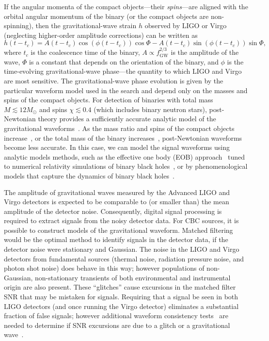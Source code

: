 If the angular momenta of the compact objects---their \emph{spins}---are
aligned with the orbital angular momentum of the binary (or the compact
objects are non-spinning), then the gravitational-wave strain $h$ observed by
LIGO or Virgo  (neglecting higher-order amplitude corrections) can be written as
\begin{equation}
h(t-t_c) = A(t - t_c) \cos( \phi(t - t_c) ) \cos \Phi - A(t - t_c) \sin( \phi(t - t_c) ) \sin \Phi,
\end{equation}
where $t_{c}$ is the coalescence time of the binary, $A \propto f_\mathrm{GW}^{2/3}$ is
the amplitude of the wave, $\Phi$ is a constant that depends on the
orientation of the binary, and $\phi$ is the time-evolving gravitational-wave
phase---the quantity to which LIGO and Virgo are most sensitive. The
gravitational-wave phase evolution is given by the particular waveform model
used in the search and depend only on the masses and spins of the compact
objects.  For detection of binaries with total mass $M \lesssim 12 M_\odot$ and spins $\chi
\lesssim 0.4$ (which includes binary neutron stars),  post-Newtonian theory
provides a sufficiently accurate analytic model of the gravitational
waveforms~\cite{Blanchet:2013haa,kidder:821,PhysRevD.47.R4183,Buonanno:2009zt,Brown:2012nn,Brown:2012qf}.
As the mass ratio and spins of the compact objects
increase~\cite{Brown:2012qf}, or the total mass of the binary
increases~\cite{Buonanno:2009zt,Brown:2012nn}, post-Newtonian waveforms 
become less accurate. In this case, we can model the signal
waveforms using analytic models methods, such as the effective one body (EOB)
approach~\cite{BuonannoDamour:1999} tuned to numerical relativity simulations of binary black holes~\cite{Taracchini:2013rva}, or by phenomenological models that capture the
dynamics of binary black holes~\cite{Hannam:2013oca,Purrer:2014fza}.

The amplitude of gravitational waves measured by the Advanced LIGO and Virgo detectors
is expected to be comparable to (or smaller than) the mean amplitude of the
detector noise.  Consequently, digital signal processing is required to
extract signals from the noisy detector data. For \ac{CBC} sources, it is
possible to construct models of the gravitational waveform. Matched
filtering~\cite{Wainstein:1962} would be the optimal method to identify
signals in the detector data, if the detector noise were stationary and
Gaussian. The noise in the LIGO and Virgo detectors from fundamental sources (thermal noise, radiation pressure noise, and photon shot noise) does behave in this way; however
populations of non-Gaussian, non-stationary transients of both environmental
and instrumental origin are also present. These ``glitches'' cause excursions in
the matched filter \ac{SNR} that may be mistaken for signals. Requiring that a
signal be seen in both LIGO detectors (and once running the Virgo detector) eliminates a substantial fraction of
false signals; however additional waveform consistency tests~\cite{Allen:2004gu}
are needed to determine if \ac{SNR} excursions are due to a glitch or a
gravitational wave~\cite{Babak:2012zx}. 
 

